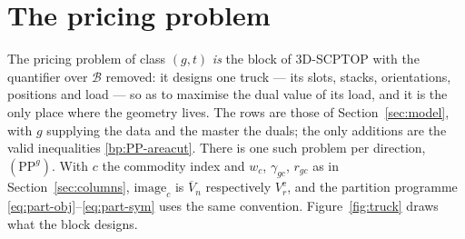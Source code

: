 \section{The pricing problem}
\label{sec:pricing}

The pricing problem of class $(g,t)$ \emph{is} the block of 3D-SCPTOP
with the quantifier over $\mathcal{B}$ removed: it designs one truck ---
its slots, stacks, orientations, positions and load --- so as to
maximise the dual value of its load, and it is the only place where the
geometry lives. The rows are those of Section~\ref{sec:model}, with $g$
supplying the data and the master the duals; the only additions are the
valid inequalities \eqref{bp:PP-areacut}. There is one such problem per
direction, $(\mathrm{PP}^{g})$. With $c$ the commodity index and
$w_{c}$, $\gamma_{gc}$, $r_{gc}$ as in Section~\ref{sec:columns},
$\mathrm{image}_{c}$ is $\overline{V}_{n}$ respectively
$V^{\mathrm{e}}_{r}$, and the partition programme
\eqref{eq:part-obj}--\eqref{eq:part-sym} uses the same convention. Figure~\ref{fig:truck} draws what the block designs.

